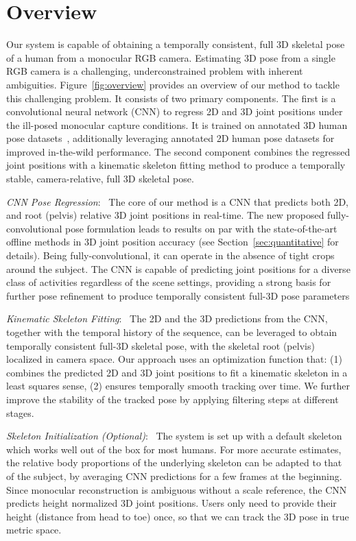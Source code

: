 \documentclass[acmtog]{acmart}
\newcommand{\parahead}[1]{\vspace{5pt}\noindent\emph{#1}:\ }
\newcommand{\change}[1]{{#1}}
\begin{document}
\section{Overview}
Our system is capable of obtaining a temporally consistent, full 3D skeletal pose of a human from a monocular RGB camera.
Estimating 3D pose from a single RGB camera is a challenging, underconstrained problem with inherent ambiguities. 
Figure~\ref{fig:overview} provides an overview of our method to tackle this challenging problem.
It consists of two primary components.
The first is a convolutional neural network (CNN) to regress 2D and 3D joint positions under the ill-posed monocular capture conditions. It is trained on annotated 3D human pose datasets~\cite{ionescu_human36_pami14,mehta_mlc3d_arxiv16}, additionally leveraging annotated 2D human pose datasets \cite{andriluka_mpii2d_cvpr14,johnson_lsp_bmvc10} for improved in-the-wild performance. 
The second component combines the regressed joint positions with a kinematic skeleton fitting method to produce a temporally stable, camera-relative, full 3D skeletal pose.

\parahead{CNN Pose Regression}
The core of our method is a CNN that predicts both 2D, and root (pelvis) relative 3D joint positions in real-time.
The new proposed fully-convolutional pose formulation leads to results on par with the state-of-the-art offline methods in 3D joint position accuracy (see Section~\ref{sec:quantitative} for details). Being fully-convolutional, it can operate in the absence of tight crops around the subject. 
The CNN is capable of predicting joint positions for a diverse class of activities regardless of the scene settings, providing a strong basis for further pose refinement to produce temporally consistent full-3D pose parameters 

\parahead{Kinematic Skeleton Fitting}
The 2D and the 3D predictions from the CNN, together with the temporal history of the sequence, can be leveraged to obtain temporally consistent full-3D skeletal pose, with the skeletal root (pelvis) localized in camera space.  
Our approach uses an optimization function that: (1) combines the predicted 2D and 3D joint positions to fit a kinematic skeleton in a least squares sense, (2) ensures temporally smooth tracking over time. 
We further improve the stability of the tracked pose by applying filtering steps at different stages.


\parahead{Skeleton Initialization (Optional)}
The system is set up with a default skeleton which works well out of the box for most humans.
For more accurate estimates, the relative body proportions of the underlying skeleton \change{can be} adapted to that of the subject, by averaging CNN predictions for a few frames at the beginning.
Since monocular reconstruction is ambiguous without a scale reference,
the CNN predicts height normalized 3D joint positions.
Users only need to provide their height (distance from head to toe) once, so that we can track the 3D pose in true metric space.
\end{document}
